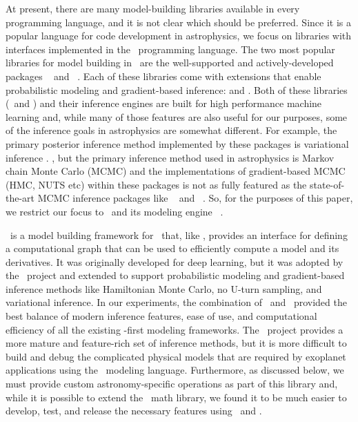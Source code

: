 \documentclass[modern]{aastex62}
\begin{document}
At present, there are many model-building libraries available in every programming language, and it is not clear which should be preferred.
Since it is a popular language for code development in astrophysics, we focus on libraries with interfaces implemented in the \python\ programming language.
The two most popular libraries for model building in \python\ are the well-supported and actively-developed packages \tensorflow\ \citep{Abadi:2016} and \pytorch\ \citep{Paszke:2017}.
Each of these libraries come with extensions that enable probabilistic modeling and gradient-based inference:  \citep{Dillon:2017} and  \citep{Bingham:2018}.
Both of these libraries (\tensorflow\ and \pytorch) and their inference engines are built for high performance machine learning and, while many of those features are also useful for our purposes, some of the inference goals in astrophysics are somewhat different.
For example, the primary posterior inference method implemented by these packages is variational inference .
, but the primary inference method used in astrophysics is Markov chain Monte Carlo (MCMC) and the implementations of gradient-based MCMC (HMC, NUTS etc) within these packages is not as fully featured as the state-of-the-art MCMC inference packages like \pymc\ \citep{Salvatier:2016} and \stan\ \citep{Carpenter:2015, Carpenter:2017}.
So, for the purposes of this paper, we restrict our focus to \pymc\ and its modeling engine \theano\ \citep{Theano-Development-Team:2016}.

\theano\ is a model building framework for \python\ that, like \tensorflow, provides an interface for defining a computational graph that can be used to efficiently compute a model and its derivatives.
It was originally developed for deep learning, but it was adopted by the \pymc\ project and extended to support probabilistic modeling and gradient-based inference methods like Hamiltonian Monte Carlo, no U-turn sampling, and variational inference.
In our experiments, the combination of \theano\ and \pymc\ provided the best balance of modern inference features, ease of use, and computational efficiency of all the existing \python-first modeling frameworks.
The \stan\ project provides a more mature and feature-rich set of inference methods, but it is more difficult to build and debug the complicated physical models that are required by exoplanet applications using the \stan\ modeling language.
Furthermore, as discussed below, we must provide custom astronomy-specific operations as part of this library and, while it is possible to extend the \stan\ math library, we found it to be much easier to develop, test, and release the necessary features using \pymc\ and \theano.
\end{document}
